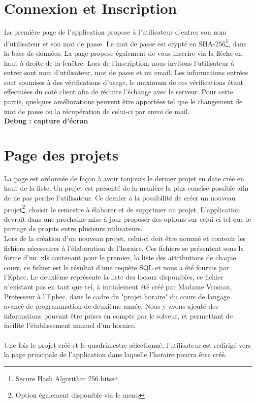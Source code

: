\section{Connexion et Inscription}

La première page de l'application propose à l'utilisateur d'entrer son nom d'utilisateur et son mot de passe. Le mot de passe est crypté en SHA-256\footnote{Secure Hash Algorithm 256 bits}, dans la base de données. La page propose également de vous inscrire via la flèche en haut à droite de la fenêtre.
\newline
\indent
Lors de l'inscription, nous invitons l'utilisateur à entrer sont nom d'utilisateur, mot de passe et un email. Les informations entrées sont soumises à des vérifications d'usage, le maximum de ces vérifications étant effectuées du coté client afin de réduire l'échange avec le serveur.
\newline
\indent
Pour cette partie, quelques améliorations peuvent être apportées tel que le changement de mot de passe ou la récupération de celui-ci par envoi de mail.\\
\newline
\indent
\textbf{Debug : capture d'écran}

\section{Page des projets}
La page est ordonnée de façon à avoir toujours le dernier projet en date créé en haut de la liste. Un projet est présenté de la manière la plus concise possible afin de ne pas perdre l'utilisateur. Ce dernier à la possibilité de créer un nouveau projet\footnote{Option également disponible via le menu}, choisir le semestre à élaborer et de supprimer un projet. L'application devrait dans une prochaine mise à jour proposer des options sur celui-ci tel que le partage de projets entre plusieurs utilisateurs.\\
\newline
\indent
Lors de la création d'un nouveau projet, celui-ci doit être nommé et contenir les fichiers nécessaires à l'élaboration de l'horaire. Ces fichiers se présentent sous la forme d'un .xls contenant pour le premier, la liste des attributions de chaque cours, ce fichier est le résultat d'une requête SQL et nous a été fournis par l'Ephec. Le deuxième représente la liste des locaux disponibles, ce fichier n'existant pas en tant que tel, à initialement été créé par Madame Vroman, Professeur à l'Ephec, dans le cadre du "projet horaire" du cours de langage avancé de programmation de deuxième année. Nous y avons ajouté des informations pouvant être prises en compte par le solveur, et permettant de facilité l'établissement manuel d'un horaire.\\
\\
Une fois le projet créé et le quadrimestre sélectionné, l'utilisateur est redirigé vers la page principale de l'application dans laquelle l'horaire pourra être créé.

